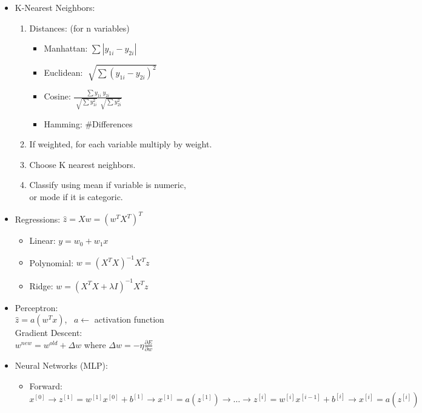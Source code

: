 \documentclass[twocolumn, 10pt]{article}
\begin{document}
\begin{itemize}[leftmargin=*, itemsep=0pt]
    \item K-Nearest Neighbors:
    \begin{enumerate}[topsep=0pt, itemsep=0pt]
        \item Distances: (for n variables)
        \begin{itemize}[topsep=0pt]
            \item Manhattan: $\displaystyle \sum |y_{1i}-y_{2i}|$
            \item Euclidean: $\displaystyle \sqrt[]{\sum (y_{1i}-y_{2i})^2}$
            \item Cosine: $\displaystyle \frac{\sum y_{1i}\ y_{2i}}
            {\sqrt[]{\sum y_{1i}^2}\ \sqrt[]{\sum y_{2i}^2}}$
            \item Hamming: \#Differences
        \end{itemize}
        \item If weighted, for each variable multiply by weight.
        \item Choose K nearest neighbors.
        \item Classify using mean if variable is numeric, \\
        or mode if it is categoric.
    \end{enumerate}

    \item Regressions: \; $\hat{z}=Xw=(w^TX^T)^T$
    \begin{itemize}[topsep=0pt, itemsep=0pt]
        \item Linear: $y=w_0+w_1x$
        \item Polynomial: $w=(X^TX)^{-1}X^Tz$
        \item Ridge: $w=(X^TX+\lambda I)^{-1}X^Tz$
    \end{itemize}

    \item Perceptron: \\
    $\hat{z}=a(w^Tx)$, \ $a  \leftarrow$ activation function \\[2pt]
    Gradient Descent: \\
    $w^{new}=w^{old}+\Delta w$ \; where \; 
    $\displaystyle \Delta w=-\eta\frac{\partial E}{\partial w}$

    \item Neural Networks (MLP):
    \begin{itemize}[topsep=0pt, itemsep=0pt]
        \item Forward: $x^{[0]}\rightarrow z^{[1]}=w^{[1]}x^{[0]}+b^{[1]}\rightarrow x^{[1]}=a\left(z^{[1]}\right) \rightarrow \ldots \rightarrow z^{[i]}=w^{[i]}x^{[i-1]}+b^{[i]} \rightarrow x^{[i]}=a\left(z^{[i]}\right)$


\end{itemize}
\end{itemize}
\end{document}
